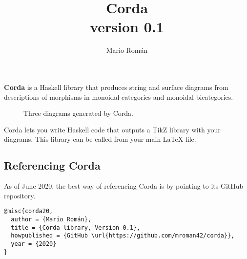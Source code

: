 \documentclass{article}
\title{Corda \\ \normalsize{\textsf{version 0.1}}}
\author{Mario Román}
\begin{document}
\maketitle

\textbf{Corda} is a Haskell library that produces string and surface diagrams from descriptions of morphisms in monoidal categories and monoidal bicategories.
\begin{figure}[h]
  \centering
  \associatorDiagram \quad
  \leftUnitorDiagram \quad
  \rightUnitorDiagram
  \caption{Three diagrams generated by Corda.}
\end{figure}

Corda lets you write Haskell code that outputs a TikZ library with your diagrams. This library can be called from your main LaTeX file.

\subsection*{Referencing Corda}

As of June 2020, the best way of referencing \textsf{Corda} is by pointing to its GitHub repository.

\begin{verbatim}
@misc{corda20,
  author = {Mario Román},
  title = {Corda library, Version 0.1},
  howpublished = {GitHub \url{https://github.com/mroman42/corda}},
  year = {2020}
}

\end{verbatim}
\end{document}
